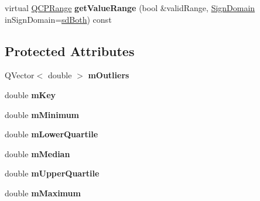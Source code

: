 \begin{DoxyCompactItemize}
\item 
\hypertarget{classQCPStatisticalBox_a2db77e9a3c2cc016381340968a250be0}{virtual \hyperlink{classQCPRange}{Q\-C\-P\-Range} {\bfseries get\-Value\-Range} (bool \&valid\-Range, \hyperlink{classQCPAbstractPlottable_a661743478a1d3c09d28ec2711d7653d8}{Sign\-Domain} in\-Sign\-Domain=\hyperlink{classQCPAbstractPlottable_a661743478a1d3c09d28ec2711d7653d8a082b98cfb91a7363a3b5cd17b0c1cd60}{sd\-Both}) const }\label{classQCPStatisticalBox_a2db77e9a3c2cc016381340968a250be0}

\end{DoxyCompactItemize}
\subsection*{Protected Attributes}
\begin{DoxyCompactItemize}
\item 
\hypertarget{classQCPStatisticalBox_a415e2f77a89396c2af999afe027bdf6c}{Q\-Vector$<$ double $>$ {\bfseries m\-Outliers}}\label{classQCPStatisticalBox_a415e2f77a89396c2af999afe027bdf6c}

\item 
\hypertarget{classQCPStatisticalBox_a86fd1d3be5c5bc11d11eda7517069af4}{double {\bfseries m\-Key}}\label{classQCPStatisticalBox_a86fd1d3be5c5bc11d11eda7517069af4}

\item 
\hypertarget{classQCPStatisticalBox_a7143ece4e7e5f9ac010739fbc390bf0c}{double {\bfseries m\-Minimum}}\label{classQCPStatisticalBox_a7143ece4e7e5f9ac010739fbc390bf0c}

\item 
\hypertarget{classQCPStatisticalBox_acac86cac93d9fa3d820b5aaa04ed96f6}{double {\bfseries m\-Lower\-Quartile}}\label{classQCPStatisticalBox_acac86cac93d9fa3d820b5aaa04ed96f6}

\item 
\hypertarget{classQCPStatisticalBox_ae43287ca13c8166bde2ac19bf0969d23}{double {\bfseries m\-Median}}\label{classQCPStatisticalBox_ae43287ca13c8166bde2ac19bf0969d23}

\item 
\hypertarget{classQCPStatisticalBox_a865afbcca332ee851aa45807381bc80e}{double {\bfseries m\-Upper\-Quartile}}\label{classQCPStatisticalBox_a865afbcca332ee851aa45807381bc80e}

\item 
\hypertarget{classQCPStatisticalBox_a16266f1e0e4e8e95b5d141c49479ef2e}{double {\bfseries m\-Maximum}}\label{classQCPStatisticalBox_a16266f1e0e4e8e95b5d141c49479ef2e}


\end{DoxyCompactItemize}
